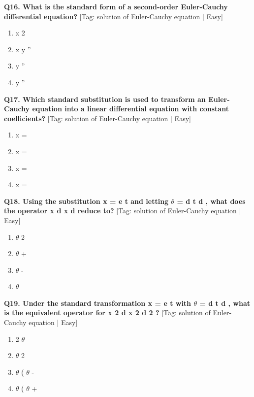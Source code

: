 \noindent\textbf{Q16. What is the standard form of a second-order Euler-Cauchy differential equation?} \hfill [Tag: solution of Euler-Cauchy equation | Easy]
\begin{enumerate}[label=(\alph*),topsep=2pt,itemsep=1pt,partopsep=0pt,parsep=0pt]
    \item {{x 2}}
    \item {{x y ''}}
    \item {{y ''}}
    \item {{y ''}}
\end{enumerate}
\vspace{2mm}

\noindent\textbf{Q17. Which standard substitution is used to transform an Euler-Cauchy equation into a linear differential equation with constant coefficients?} \hfill [Tag: solution of Euler-Cauchy equation | Easy]
\begin{enumerate}[label=(\alph*),topsep=2pt,itemsep=1pt,partopsep=0pt,parsep=0pt]
    \item {{x =}}
    \item {{x =}}
    \item {{x =}}
    \item {{x =}}
\end{enumerate}
\vspace{2mm}

\noindent\textbf{Q18. Using the substitution x = e t and letting $\theta$ = d t d , what does the operator x d x d reduce to?} \hfill [Tag: solution of Euler-Cauchy equation | Easy]
\begin{enumerate}[label=(\alph*),topsep=2pt,itemsep=1pt,partopsep=0pt,parsep=0pt]
    \item {{$\theta$ 2}}
    \item {{$\theta$ +}}
    \item {{$\theta$ -}}
    \item {{$\theta$}}
\end{enumerate}
\vspace{2mm}

\noindent\textbf{Q19. Under the standard transformation x = e t with $\theta$ = d t d , what is the equivalent operator for x 2 d x 2 d 2 ?} \hfill [Tag: solution of Euler-Cauchy equation | Easy]
\begin{enumerate}[label=(\alph*),topsep=2pt,itemsep=1pt,partopsep=0pt,parsep=0pt]
    \item {{2 $\theta$}}
    \item {{$\theta$ 2}}
    \item {{$\theta$ ( $\theta$ -}}
    \item {{$\theta$ ( $\theta$ +}}
\end{enumerate}
\vspace{2mm}

